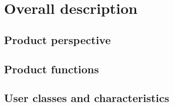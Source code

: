 \section{Overall description}
  \subsection{Product perspective}
  \subsection{Product functions}
  \subsection{User classes and characteristics}
